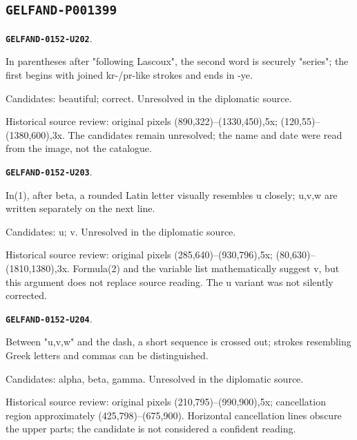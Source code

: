 \documentclass[11pt]{article}
\theoremstyle{definition}
\theoremstyle{remark}
\begin{document}
\subsection*{\texttt{GELFAND-P001399}}
\par\noindent\leavevmode{}\label{GELFAND-0152-U202}\label{GELFAND-P001399:heading-parenthesis:note}\textbf{\texttt{GELFAND-0152-U202}}.\nopagebreak[4]\par
In parentheses after "following Lascoux", the second word is securely "series"; the first begins with joined kr-/pr-like strokes and ends in -ye.\par
Candidates: beautiful; correct. Unresolved in the diplomatic source.\par
Historical source review: original pixels (890,322)–(1330,450),5x; (120,55)–(1380,600),3x. The candidates remain unresolved; the name and date were read from the image, not the catalogue.\par\medskip
\par\noindent\leavevmode{}\label{GELFAND-0152-U203}\label{GELFAND-P001399:equation-1-second-variable:note}\textbf{\texttt{GELFAND-0152-U203}}.\nopagebreak[4]\par
In(1), after beta, a rounded Latin letter visually resembles u closely; u,v,w are written separately on the next line.\par
Candidates: u; v. Unresolved in the diplomatic source.\par
Historical source review: original pixels (285,640)–(930,796),5x; (80,630)–(1810,1380),3x. Formula(2) and the variable list mathematically suggest v, but this argument does not replace source reading. The u variant was not silently corrected.\par\medskip
\par\noindent\leavevmode{}\label{GELFAND-0152-U204}\label{GELFAND-P001399:cancelled-coefficients:note}\textbf{\texttt{GELFAND-0152-U204}}.\nopagebreak[4]\par
Between "u,v,w" and the dash, a short sequence is crossed out; strokes resembling Greek letters and commas can be distinguished.\par
Candidates: alpha, beta, gamma. Unresolved in the diplomatic source.\par
Historical source review: original pixels (210,795)–(990,900),5x; cancellation region approximately (425,798)–(675,900). Horizontal cancellation lines obscure the upper parts; the candidate is not considered a confident reading.\par\medskip
\end{document}

